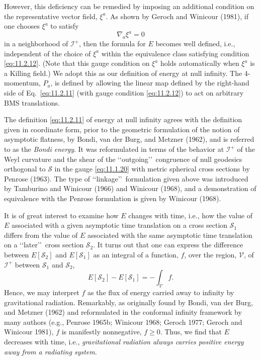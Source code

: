 However, this deficiency can be remedied by imposing an additional condition on the
representative vector field, \(\xi^a\). As shown by Geroch and Winicour (1981), if one
chooses \(\xi^a\) to satisfy
\begin{equation}
  \nabla_a\xi^a=0
  \tag{11.2.12}\label{eq:11.2.12}
\end{equation}
in a neighborhood of \(\mathcal I^+\), then the formula for \(E\) becomes well
defined, i.e., independent of the choice of \(\xi^a\) within the equivalence class
satisfying condition \eqref{eq:11.2.12}. (Note that this gauge condition on
\(\xi^a\) holds automatically when \(\xi^a\) is a Killing field.) We adopt this as our
definition of energy at null infinity. The 4-momentum, \(P_a\), is defined by
allowing the linear map defined by the right-hand side of Eq.~\eqref{eq:11.2.11}
(with gauge condition \eqref{eq:11.2.12}) to act on arbitrary BMS translations.

The definition \eqref{eq:11.2.11} of energy at null infinity agrees with the
definition given in coordinate form, prior to the geometric formulation of the notion
of asymptotic flatness, by Bondi, van der Burg, and Metzner (1962), and is referred
to as the \emph{Bondi energy}. It was reformulated in terms of the behavior at
\(\mathcal I^+\) of the Weyl curvature and the shear of the \lq\lq outgoing\rq\rq\
congruence of null geodesics orthogonal to \(\mathcal S\) in the gauge
\eqref{eq:11.1.20} with metric spherical cross sections by Penrose (1963). The type
of \lq\lq linkage\rq\rq\ formulation given above was introduced by Tamburino and
Winicour (1966) and Winicour (1968), and a demonstration of equivalence with the
Penrose formulation is given by Winicour (1968).

It is of great interest to examine how \(E\) changes with time, i.e., how the value of
\(E\) associated with a given asymptotic time translation on a cross section
\(\mathcal S_1\) differs from the value of \(E\) associated with the same asymptotic
time translation on a \lq\lq later\rq\rq\ cross section \(\mathcal S_2\). It turns out that one
can express the difference between \(E[\mathcal S_2]\) and \(E[\mathcal S_1]\) as an
integral of a function, \(f\), over the region, \(\mathcal V\), of \(\mathcal I^+\)
between \(\mathcal S_1\) and \(\mathcal S_2\),
\begin{equation}
  E[\mathcal S_2]-E[\mathcal S_1]=-\int_{\mathcal V}f.
  \tag{11.2.13}\label{eq:11.2.13}
\end{equation}
Hence, we may interpret \(f\) as the flux of energy carried away to infinity by
gravitational radiation. Remarkably, as originally found by Bondi, van der Burg, and
Metzner (1962) and reformulated in the conformal infinity framework by many
authors (e.g., Penrose 1965b; Winicour 1968; Geroch 1977; Geroch and Winicour
1981), \(f\) is manifestly nonnegative, \(f\geq0\). Thus, we find that \(E\) decreases
with time, i.e., \emph{gravitational radiation always carries positive energy away from
a radiating system}.

